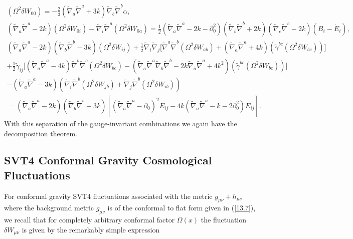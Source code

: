 \documentclass[aps,onecolumn,10pt]{revtex4}
\numberwithin{equation}{section}
\numberwithin{equation}{section}
\begin{document}
\begin{align}
(\Omega^2\delta W_{00})= - \tfrac{2}{3}  (\tilde\nabla_a\tilde\nabla^a + 3k)\tilde\nabla_b\tilde\nabla^b \alpha,&
\nonumber\\
(\tilde\nabla_a\tilde\nabla^a-2k)(\Omega^2\delta W_{0i}) - \tilde\nabla_i \tilde\nabla^a (\Omega^2\delta W_{0a}) =
\tfrac{1}{2} (\tilde\nabla_a\tilde\nabla^a - 2k - \partial_0^2)(\tilde\nabla_b\tilde\nabla^b + 2k)(\tilde\nabla_c\tilde\nabla^c -2k)(B_i-\dot{E}_i),&
\nonumber\\
(\tilde\nabla_a\tilde\nabla^a-2k)(\tilde\nabla_b\tilde\nabla^b-3k)(\Omega^2\delta W_{ij})
+ \tfrac{1}{2} \tilde\nabla_i\tilde\nabla_j\big[ \tilde\nabla^a\tilde\nabla^b (\Omega^2\delta W_{ab}) + (\tilde\nabla_a\tilde\nabla^a +4k)(\tilde{\gamma}^{bc}(\Omega^2\delta W_{bc}))\big]&
\nonumber\\
+\tfrac{1}{2} \tilde{\gamma}_{ij} \big[ (\tilde\nabla_a\tilde\nabla^a-4k)\tilde\nabla^b\tilde\nabla^c (\Omega^2\delta W_{bc})-(\tilde\nabla_a\tilde\nabla^a\tilde\nabla_b\tilde\nabla^b -2k \tilde\nabla_a\tilde\nabla^a +4k^2)(\tilde{\gamma}^{bc}(\Omega^2\delta W_{bc}))\big]&
\nonumber\\
-(\tilde\nabla_a\tilde\nabla^a -3k)(\tilde\nabla_i\tilde\nabla^b (\Omega^2\delta W_{jb}) + \tilde\nabla_j \tilde\nabla^b (\Omega^2\delta W_{ib}))&
\nonumber\\
=(\tilde\nabla_a\tilde\nabla^a-2k)(\tilde\nabla_b\tilde\nabla^b-3k)\left[ (\tilde\nabla_a\tilde\nabla^a-\partial_0)^2 E_{ij} - 4k (\tilde\nabla_a\tilde\nabla^a - k-2\partial_0^2)E_{ij} \right].&
\label{13.17}
\end{align}
%
With this separation of the gauge-invariant combinations we again have the decomposition theorem. 


\subsection{SVT4 Conformal Gravity Cosmological Fluctuations} 

For conformal gravity SVT4 fluctuations associated with the metric $g_{\mu\nu}+h_{\mu\nu}$ where the background metric $g_{\mu\nu}$ is of the conformal to flat form given in (\ref{13.7}), we recall that for completely arbitrary conformal factor $\Omega(x)$ the fluctuation $\delta W_{\mu\nu}$ is given by the remarkably simple expression  \cite{Amarasinghe2018}
\end{document}
